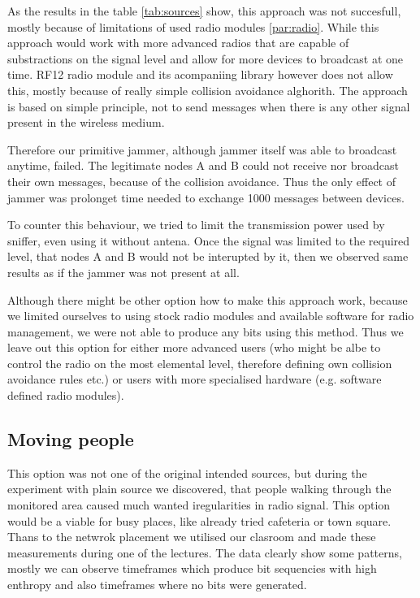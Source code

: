 \documentclass[
  print, %
  table,   %
  nolof,     %
  nolot,     %
           oneside
]{fithesis3}
\begin{document}
  As the results in the table \ref{tab:sources} show, this approach was not succesfull, mostly because of limitations of used radio modules \ref{par:radio}. While this approach would work with more advanced radios that are capable of substractions on the signal level and allow for more devices to broadcast at one time. RF12 radio module and its acompaniing library however does not allow this, mostly because of really simple collision avoidance alghorith. The approach is based on simple principle, not to send messages when there is any other signal present in the wireless medium.

  Therefore our primitive jammer, although jammer itself was able to broadcast anytime, failed. The legitimate nodes A and B could not receive nor broadcast their own messages, because of the collision avoidance. Thus the only effect of jammer was prolonget time needed to exchange 1000 messages between devices.

  To counter this behaviour, we tried to limit the transmission power used by sniffer, even using it without antena. Once the signal was limited to the required level, that nodes A and B would not be interupted by it, then we observed same results as if the jammer was not present at all.

  Although there might be other option how to make this approach work, because we limited ourselves to using stock radio modules and available software for radio management, we were not able to produce any bits using this method.
  Thus we leave out this option for either more advanced users (who might be albe to control the radio on the most elemental level, therefore defining own collision avoidance rules etc.) or users with more specialised hardware (e.g. software defined radio modules). %

  \subsection{Moving people}\label{src:people}
  This option was not one of the original intended sources, but during the experiment with plain source we discovered, that people walking through the monitored area caused much wanted iregularities in radio signal. This option would be a viable for busy places, like already tried cafeteria \cite{Mathur2008Rssi} or town square. Thans to the netwrok placement we utilised our clasroom and made these measurements during one of the lectures. The data clearly show some patterns, mostly we can observe timeframes which produce bit sequencies with high enthropy and also timeframes where no bits were generated.
\end{document}

